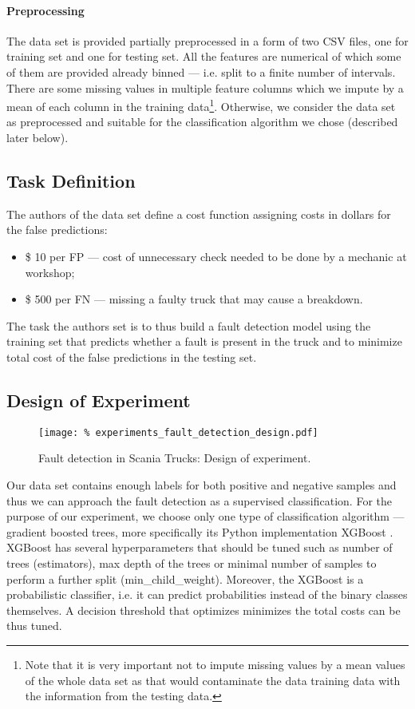\paragraph{Preprocessing}

The data set is provided partially preprocessed in a form of two CSV files, one for training set and one for testing set.
All the features are numerical of which some of them are provided already binned --- i.e. split to a finite number of intervals. 
There are some missing values in multiple feature columns which we impute by a mean of each column in the training data\footnote{Note that it is very important not to impute missing values by a mean values of the whole data set as that would contaminate the data training data with the information from the testing data.}.
Otherwise, we consider the data set as preprocessed and suitable for the classification algorithm we chose (described later below).

\subsection{Task Definition}

The authors of the data set define a cost function assigning costs in dollars for the false predictions:
\begin{itemize}
    \item \$ 10 per FP --- cost of unnecessary check needed to be done by a mechanic at workshop;
    \item \$ 500 per FN --- missing a faulty truck that may cause a breakdown.
\end{itemize}
The task the authors set is to thus build a fault detection model using the training set that predicts whether a fault is present in the truck and to minimize total cost of the false predictions in the testing set.

\subsection{Design of Experiment}

\begin{figure}
	\centering
    \texttt{[image: \%
        experiments\_fault\_detection\_design.pdf]}
	\caption{Fault detection in Scania Trucks: Design of experiment.}
	\label{fig:experiments_fault_detection_design}
\end{figure}

Our data set contains enough labels for both positive and negative samples and thus we can approach the fault detection as a supervised classification.
For the purpose of our experiment, we choose only one type of classification algorithm --- gradient boosted trees, more specifically its Python implementation XGBoost \cite{xgboost}.
XGBoost has several hyperparameters that should be tuned such as number of trees (estimators), max depth of the trees or minimal number of samples to perform a further split (min\_child\_weight).
Moreover, the XGBoost is a probabilistic classifier, i.e. it can predict probabilities instead of the binary classes themselves.
A decision threshold that optimizes minimizes the total costs can be thus tuned.


